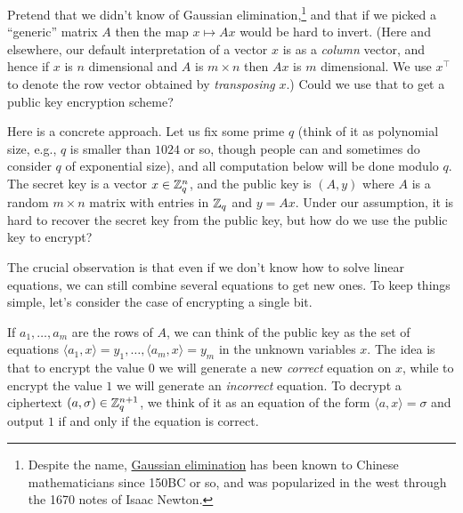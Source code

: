 Pretend that we didn't know of Gaussian elimination,\footnote{Despite
  the name, \href{https://goo.gl/3HNb5U}{Gaussian elimination} has been
  known to Chinese mathematicians since 150BC or so, and was popularized
  in the west through the 1670 notes of Isaac Newton.} and that if we
picked a ``generic'' matrix \(A\) then the map \(x \mapsto Ax\) would be
hard to invert. (Here and elsewhere, our default interpretation of a
vector \(x\) is as a \emph{column} vector, and hence if \(x\) is \(n\)
dimensional and \(A\) is \(m\times n\) then \(Ax\) is \(m\) dimensional.
We use \(x^\top\) to denote the row vector obtained by
\emph{transposing} \(x\).) Could we use that to get a public key
encryption scheme?

Here is a concrete approach. Let us fix some prime \(q\) (think of it as
polynomial size, e.g., \(q\) is smaller than \(1024\) or so, though
people can and sometimes do consider \(q\) of exponential size), and all
computation below will be done modulo \(q\). The secret key is a vector
\(x\in{\mathbb{Z}}_q^n\), and the public key is \((A,y)\) where \(A\) is a random
\(m\times n\) matrix with entries in \({\mathbb{Z}}_q\) and \(y=Ax\). Under our
assumption, it is hard to recover the secret key from the public key,
but how do we use the public key to encrypt?

The crucial observation is that even if we don't know how to solve
linear equations, we can still combine several equations to get new
ones. To keep things simple, let's consider the case of encrypting a
single bit.


If \(a_1,\ldots,a_m\) are the rows of \(A\), we can think of the public
key as the set of equations
\(\langle a_1,x \rangle=y_1,\ldots, \langle a_m,x \rangle=y_m\) in the
unknown variables \(x\). The idea is that to encrypt the value \(0\) we
will generate a new \emph{correct} equation on \(x\), while to encrypt
the value \(1\) we will generate an \emph{incorrect} equation. To
decrypt a ciphertext \((a,\sigma)\in {\mathbb{Z}}_q^{n+1}\), we think of it as an
equation of the form \(\langle a,x \rangle=\sigma\) and output \(1\) if
and only if the equation is correct.

